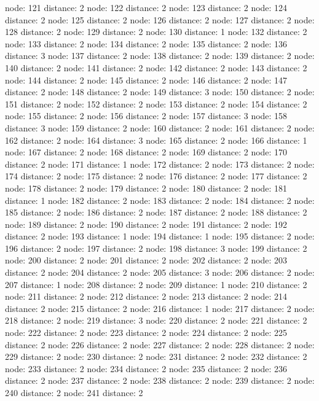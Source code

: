 \documentclass{article}
\begin{document}
node: 121 distance: 2
node: 122 distance: 2
node: 123 distance: 2
node: 124 distance: 2
node: 125 distance: 2
node: 126 distance: 2
node: 127 distance: 2
node: 128 distance: 2
node: 129 distance: 2
node: 130 distance: 1
node: 132 distance: 2
node: 133 distance: 2
node: 134 distance: 2
node: 135 distance: 2
node: 136 distance: 3
node: 137 distance: 2
node: 138 distance: 2
node: 139 distance: 2
node: 140 distance: 2
node: 141 distance: 2
node: 142 distance: 2
node: 143 distance: 2
node: 144 distance: 2
node: 145 distance: 2
node: 146 distance: 2
node: 147 distance: 2
node: 148 distance: 2
node: 149 distance: 3
node: 150 distance: 2
node: 151 distance: 2
node: 152 distance: 2
node: 153 distance: 2
node: 154 distance: 2
node: 155 distance: 2
node: 156 distance: 2
node: 157 distance: 3
node: 158 distance: 3
node: 159 distance: 2
node: 160 distance: 2
node: 161 distance: 2
node: 162 distance: 2
node: 164 distance: 3
node: 165 distance: 2
node: 166 distance: 1
node: 167 distance: 2
node: 168 distance: 2
node: 169 distance: 2
node: 170 distance: 2
node: 171 distance: 1
node: 172 distance: 2
node: 173 distance: 2
node: 174 distance: 2
node: 175 distance: 2
node: 176 distance: 2
node: 177 distance: 2
node: 178 distance: 2
node: 179 distance: 2
node: 180 distance: 2
node: 181 distance: 1
node: 182 distance: 2
node: 183 distance: 2
node: 184 distance: 2
node: 185 distance: 2
node: 186 distance: 2
node: 187 distance: 2
node: 188 distance: 2
node: 189 distance: 2
node: 190 distance: 2
node: 191 distance: 2
node: 192 distance: 2
node: 193 distance: 1
node: 194 distance: 1
node: 195 distance: 2
node: 196 distance: 2
node: 197 distance: 2
node: 198 distance: 3
node: 199 distance: 2
node: 200 distance: 2
node: 201 distance: 2
node: 202 distance: 2
node: 203 distance: 2
node: 204 distance: 2
node: 205 distance: 3
node: 206 distance: 2
node: 207 distance: 1
node: 208 distance: 2
node: 209 distance: 1
node: 210 distance: 2
node: 211 distance: 2
node: 212 distance: 2
node: 213 distance: 2
node: 214 distance: 2
node: 215 distance: 2
node: 216 distance: 1
node: 217 distance: 2
node: 218 distance: 2
node: 219 distance: 3
node: 220 distance: 2
node: 221 distance: 2
node: 222 distance: 2
node: 223 distance: 2
node: 224 distance: 2
node: 225 distance: 2
node: 226 distance: 2
node: 227 distance: 2
node: 228 distance: 2
node: 229 distance: 2
node: 230 distance: 2
node: 231 distance: 2
node: 232 distance: 2
node: 233 distance: 2
node: 234 distance: 2
node: 235 distance: 2
node: 236 distance: 2
node: 237 distance: 2
node: 238 distance: 2
node: 239 distance: 2
node: 240 distance: 2
node: 241 distance: 2
\end{document}
